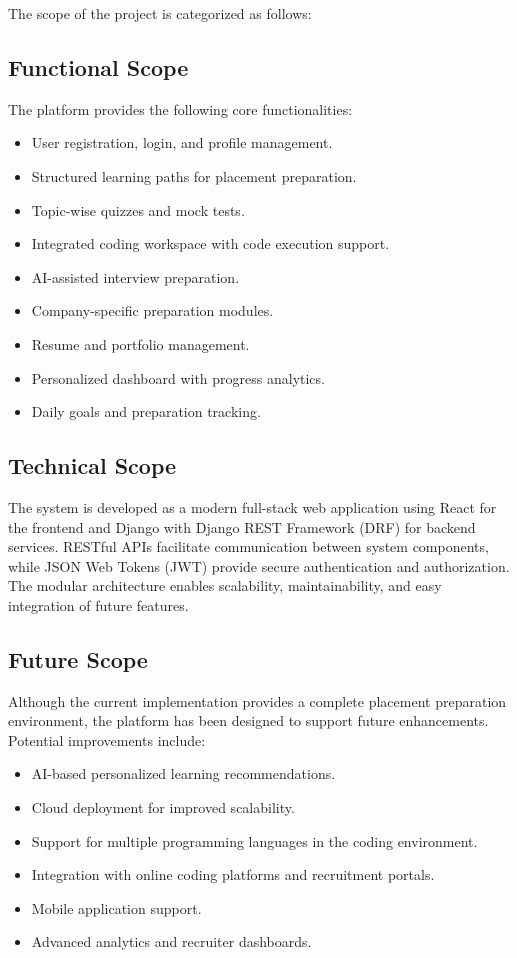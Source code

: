 The scope of the project is categorized as follows:

\subsection*{Functional Scope}

The platform provides the following core functionalities:

\begin{itemize}
    \item User registration, login, and profile management.
    \item Structured learning paths for placement preparation.
    \item Topic-wise quizzes and mock tests.
    \item Integrated coding workspace with code execution support.
    \item AI-assisted interview preparation.
    \item Company-specific preparation modules.
    \item Resume and portfolio management.
    \item Personalized dashboard with progress analytics.
    \item Daily goals and preparation tracking.
\end{itemize}

\subsection*{Technical Scope}

The system is developed as a modern full-stack web application using React for the frontend and Django with Django REST Framework (DRF) for backend services. RESTful APIs facilitate communication between system components, while JSON Web Tokens (JWT) provide secure authentication and authorization. The modular architecture enables scalability, maintainability, and easy integration of future features.

\subsection*{Future Scope}

Although the current implementation provides a complete placement preparation environment, the platform has been designed to support future enhancements. Potential improvements include:

\begin{itemize}
    \item AI-based personalized learning recommendations.
    \item Cloud deployment for improved scalability.
    \item Support for multiple programming languages in the coding environment.
    \item Integration with online coding platforms and recruitment portals.
    \item Mobile application support.
    \item Advanced analytics and recruiter dashboards.
\end{itemize}

